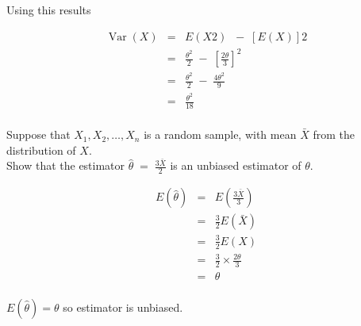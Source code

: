 \documentclass[a4paper,12pt]{article}
\begin{document}
Using this results

\begin{eqnarray*} \operatorname{Var}( X ) &=& E ( X 2 ) \;-\; [ E ( X )] 2 \\
&=&  \frac{ \theta^2}{2} \;-\; \left[ \frac{2 \theta}{3}\right] ^2 \\
&=&  \frac{ \theta^2}{2} \;-\;  \frac{4 \theta ^2 }{9}\\
&=&  \frac{ \theta^2}{18} \\
\end{eqnarray*}

\newpage

\begin{framed}
Suppose that $X_1 , X_2 , \ldots , X_n$ is a random sample, with mean $\bar{X}$  from the distribution
of $X$.
\\ 
Show that the estimator $ {  \displaystyle \hat{\theta}  \;=\; \frac{3\bar{X}}{2} }$ is an unbiased estimator of $\theta$.
\end{framed}

\begin{eqnarray*}
E(\hat{\theta}) &=&  E \left( \frac{3\bar{X}}{3} \right)\\
&=& \frac{3}{2} E(\bar{X}) \\ 
&=& \frac{3}{2} E(X) \\ 
&=& \frac{3}{2} \times \frac{2 \theta }{3} \\ 
&=& \theta \\
\end{eqnarray*}

$E(\hat{\theta}) = \theta$ so estimator is unbiased.


\end{document}
